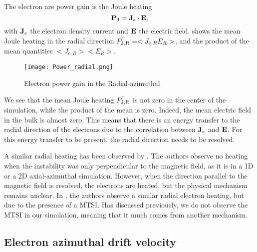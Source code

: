 The electron are power gain is the Joule heating
\begin{equation} \label{eq-epower}
    {\mathbf P_{\rm J}} = {\mathbf J_e} \cdot {\mathbf E},
\end{equation}
with ${\mathbf J_e}$ the electron density current and ${\mathbf E}$ the electric field.
 shows the mean Joule heating in the radial direction $\bar{P_{\rm J, R}} = < J_{e, R} E_R >$, and the product of the mean quantities $< J_{e, R}>  < E_R >$.

\begin{figure}[hbtp]
  \centering
  \texttt{[image: Power\_radial.png]}
  \caption{Electron power gain in the Radial-azimuthal }
  \label{fig-epower_radial}
\end{figure}

We see that the mean Joule heating $\bar{P_{\rm J, R}}$ is not zero in the center of the simulation, while the product of the mean is zero.
Indeed, the mean electric field in the bulk is almost zero.
This means that there is an energy transfer to the radial direction of the electrons due to the correlation between ${\mathbf J_e}$ and ${\mathbf E}$.
For this energy transfer to be present, the radial direction needs to be resolved.

A similar radial heating has been observed by \citet{heron2013}.
The authors observe no heating when the instability was only perpendicular to the magnetic field, as it is in a \ac{1D} or a \ac{2D} axial-azimuthal simulation.
However, when the direction parallel to the magnetic field is resolved, the electrons are heated, but the physical mechanism remains unclear.
In \citet{janhunen}, the authors observe a similar radial electron heating, but due to the presence of a \ac{MTSI}.
Has discussed previously, we do not observe the \ac{MTSI} in our simulation, meaning that it much comes from another mechanism.


\subsection{Electron azimuthal drift velocity} \label{subsec-drift}
